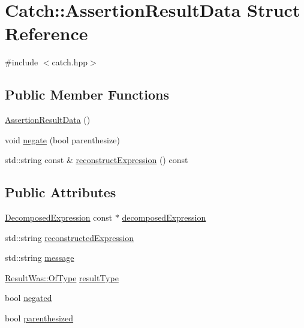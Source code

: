 \hypertarget{structCatch_1_1AssertionResultData}{\section{Catch\-:\-:Assertion\-Result\-Data Struct Reference}
\label{structCatch_1_1AssertionResultData}
}


{\ttfamily \#include $<$catch.\-hpp$>$}

\subsection*{Public Member Functions}
\begin{DoxyCompactItemize}
\item 
\hyperlink{structCatch_1_1AssertionResultData_a37179edde9f853f22d4456677fd97701}{Assertion\-Result\-Data} ()
\item 
void \hyperlink{structCatch_1_1AssertionResultData_a3b4df7cd1f8228ea1144b5cd0af6006a}{negate} (bool parenthesize)
\item 
std\-::string const \& \hyperlink{structCatch_1_1AssertionResultData_ac45208e1a464864f4112ac72c6938b4f}{reconstruct\-Expression} () const 
\end{DoxyCompactItemize}
\subsection*{Public Attributes}
\begin{DoxyCompactItemize}
\item 
\hyperlink{structCatch_1_1DecomposedExpression}{Decomposed\-Expression} const $\ast$ \hyperlink{structCatch_1_1AssertionResultData_a45b2bf2ed11da83d09dd78a2b7a44cd4}{decomposed\-Expression}
\item 
std\-::string \hyperlink{structCatch_1_1AssertionResultData_a9e809d36fffbeb1c7d0cbe7382dd9595}{reconstructed\-Expression}
\item 
std\-::string \hyperlink{structCatch_1_1AssertionResultData_ac34215803c4c4a88f795879f61c1f7b4}{message}
\item 
\hyperlink{structCatch_1_1ResultWas_a624e1ee3661fcf6094ceef1f654601ef}{Result\-Was\-::\-Of\-Type} \hyperlink{structCatch_1_1AssertionResultData_a7ceab4a7ff722aec5587e3748caf66b7}{result\-Type}
\item 
bool \hyperlink{structCatch_1_1AssertionResultData_a17773c6f999cfded12e470b0321694a1}{negated}
\item 
bool \hyperlink{structCatch_1_1AssertionResultData_a8418e3744b5486cb7f0d79c84569078e}{parenthesized}
\end{DoxyCompactItemize}


